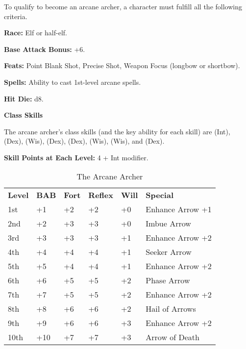 
\Requirements

To qualify to become an arcane archer, a character must fulfill all the following 
criteria.

\textbf{Race:} Elf or half-elf.

\textbf{Base Attack Bonus:} +6.

\textbf{Feats:} Point Blank Shot, Precise Shot, Weapon Focus (longbow or shortbow).

\textbf{Spells:} Ability to cast 1st-level arcane spells.

\Basics

\textbf{Hit Die:} d8.

\textbf{Class Skills}

The arcane archer's class skills (and the key ability for each skill) are  
(Int),  (Dex),  (Wis),  (Dex),  (Dex),  (Wis),  
(Wis), and  (Dex).

\textbf{Skill Points at Each Level:} 4 + Int modifier.

\begin{table}[htb]
\caption{The Arcane Archer}
\centering
\begin{tabular}{*{6}{l}}
\textbf{Level} & \textbf{BAB} & \textbf{Fort} & \textbf{Reflex} & \textbf{Will} & \textbf{Special} \\
1st & +1 & +2 & +2 & +0 & Enhance Arrow +1 \\
2nd & +2 & +3 & +3 & +0 & Imbue Arrow \\
3rd & +3 & +3 & +3 & +1 & Enhance Arrow +2 \\
4th & +4 & +4 & +4 & +1 & Seeker Arrow \\
5th & +5 & +4 & +4 & +1 & Enhance Arrow +2 \\
6th & +6 & +5 & +5 & +2 & Phase Arrow \\
7th & +7 & +5 & +5 & +2 & Enhance Arrow +2 \\
8th & +8 & +6 & +6 & +2 & Hail of Arrows\\
9th & +9 & +6 & +6 & +3 & Enhance Arrow +2 \\
10th & +10 & +7 & +7 & +3 & Arrow of Death\\
\end{tabular}
\end{table}

